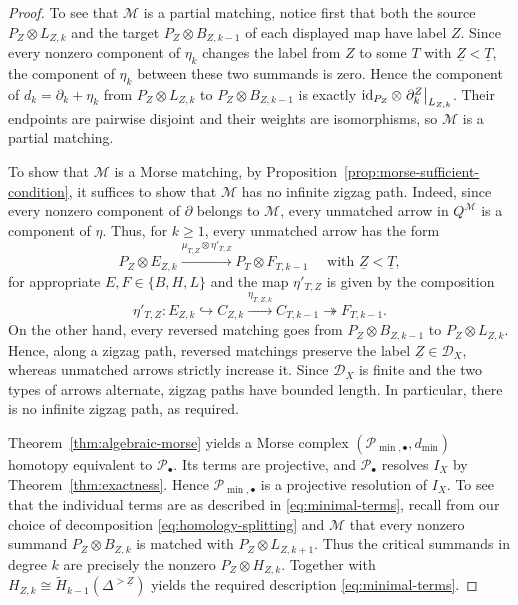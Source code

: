 \documentclass[a4paper,leqno]{amsart}
\begin{document}
\begin{proof} 
To see that $\mathcal M$ is a partial matching, notice first that both the source $P_Z\otimes L_{Z,k}$ and the target $P_Z\otimes B_{Z,k-1}$ of each displayed map have label $Z$. Since every nonzero component of $\eta_k$ changes the label from $Z$ to some $T$ with $\underline{Z}<\underline{T}$, the component of $\eta_k$ between these two summands is zero. Hence the component of $d_k=\partial_k+\eta_k$ from $P_Z\otimes L_{Z,k}$ to $P_Z\otimes B_{Z,k-1}$ is exactly $\operatorname{id}_{P_Z}\otimes\left.\partial^Z_k\right|_{L_{Z,k}}$. Their endpoints are pairwise disjoint and their weights are isomorphisms, so $\mathcal M$ is a partial matching.

To show that $\mathcal M$ is a Morse matching, by Proposition~\ref{prop:morse-sufficient-condition}, it suffices to show that $\mathcal M$ has no infinite zigzag path.
Indeed, since every nonzero component of $\partial$ belongs to $\mathcal M$, every unmatched arrow in $Q^{\mathcal M}$ is a component of $\eta$. Thus, for $k\geq1$, every unmatched arrow has the form
\[
 P_Z\otimes E_{Z,k}
 \xrightarrow{\mu_{T,Z}\otimes\eta'_{T,Z}}
 P_T\otimes F_{T,k-1}
 \quad \text{ with }\underline{Z}<\underline{T},
\]
for appropriate $E,F\in\{B,H,L\}$ and the map $\eta'_{T,Z}$ is given by the composition
\begin{equation*}\label{eq:delta'}
 \eta'_{T,Z}:
 E_{Z,k}\hookrightarrow C_{Z,k}
 \xrightarrow{\eta_{T,Z,k}}C_{T,k-1}
 \twoheadrightarrow F_{T,k-1}.
\end{equation*}
On the other hand, every reversed matching goes from $P_Z\otimes B_{Z,k-1}$ to $P_Z\otimes L_{Z,k}$. Hence, along a zigzag path, reversed matchings preserve the label $\underline{Z}\in\mathcal D_X$, whereas unmatched arrows strictly increase it. 
Since $\mathcal D_X$ is finite and the two types of arrows alternate, zigzag paths have bounded length. In particular, there is no infinite zigzag path, as required.

Theorem~\ref{thm:algebraic-morse} yields a Morse complex $(\mathcal P_{\min,\bullet},d_{\min})$ homotopy equivalent to $\mathcal P_\bullet$.
Its terms are projective, and $\mathcal P_\bullet$ resolves $I_X$ by Theorem~\ref{thm:exactness}.  Hence $\mathcal P_{\min,\bullet}$ is a projective resolution of $I_X$.  To see that the individual terms are as described in \eqref{eq:minimal-terms}, recall from our choice of decomposition \eqref{eq:homology-splitting} and $\mathcal{M}$ that every nonzero summand $P_Z\otimes B_{Z,k}$ is matched with $P_Z\otimes L_{Z,k+1}$.
Thus the critical summands in degree $k$ are precisely the nonzero $P_Z\otimes H_{Z,k}$. Together with $H_{Z,k}\cong\widetilde H_{k-1}(\Delta^{>\underline{Z}})$ yields the required description \eqref{eq:minimal-terms}. 


\end{proof}
\end{document}

